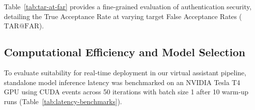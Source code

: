 Table~\ref{tab:tar-at-far} provides a fine-grained evaluation of authentication security, detailing the True Acceptance Rate at varying target False Acceptance Rates ($\text{TAR@FAR}$).

\begin{table}[H]
\centering
{}
\caption{True Acceptance Rate (\%) at specific False Acceptance Rate thresholds ($\text{TAR@FAR}$).}
\label{tab:tar-at-far}
\end{table}

\subsection{Computational Efficiency and Model Selection}

To evaluate suitability for real-time deployment in our virtual assistant pipeline, standalone model inference latency was benchmarked on an NVIDIA Tesla T4 GPU using CUDA events across 50 iterations with batch size 1 after 10 warm-up runs (Table~\ref{tab:latency-benchmarks}).

\begin{table}[H]
\centering
{}
\caption{Model complexity and isolated GPU inference latency (batch size 1 on NVIDIA Tesla T4).}
\label{tab:latency-benchmarks}
\end{table}

